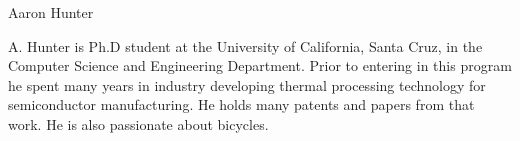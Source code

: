 \documentclass[journal]{IEEEtran}
\begin{document}




% 
\begin{IEEEbiography}{Aaron Hunter}

A. Hunter is  Ph.D student at the University of California, Santa Cruz, in the Computer Science and Engineering Department.  Prior to entering in this program he spent many years in industry developing thermal processing technology for semiconductor manufacturing.  He holds many patents and papers from that work.  He is also passionate about bicycles. 
\end{IEEEbiography}










\end{document}
